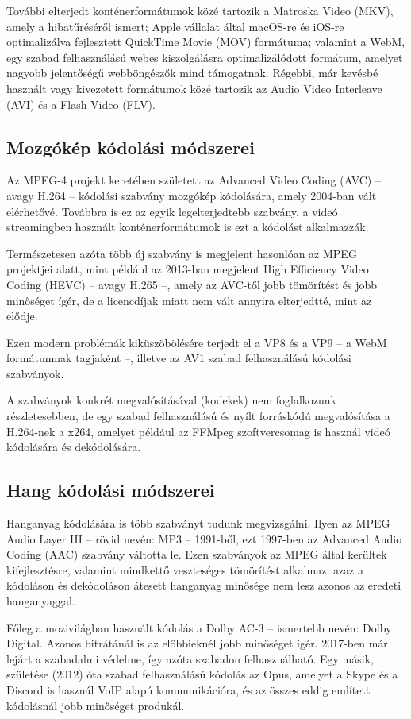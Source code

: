 További elterjedt konténerformátumok közé tartozik a Matroska Video (MKV), amely a hibatűréséről ismert; Apple vállalat által macOS-re és iOS-re optimalizálva fejlesztett QuickTime Movie (MOV) formátuma; valamint a WebM, egy szabad felhasználású webes kiszolgálásra optimalizálódott formátum, amelyet nagyobb jelentőségű webböngészők mind támogatnak. Régebbi, már kevésbé használt vagy kivezetett formátumok közé tartozik az Audio Video Interleave (AVI) és a Flash Video (FLV).

\subsection{Mozgókép kódolási módszerei}

Az MPEG-4 projekt keretében született az Advanced Video Coding (AVC) -- avagy H.264 -- kódolási szabvány mozgókép kódolására, amely 2004-ban vált elérhetővé. Továbbra is ez az egyik legelterjedtebb szabvány, a videó streamingben használt konténerformátumok is ezt a kódolást alkalmazzák.

Természetesen azóta több új szabvány is megjelent hasonlóan az MPEG projektjei alatt, mint például az 2013-ban megjelent High Efficiency Video Coding (HEVC) -- avagy H.265 --, amely az AVC-től jobb tömörítést és jobb minőséget ígér, de a licencdíjak miatt nem vált annyira elterjedtté, mint az elődje.

Ezen modern problémák kiküszöbölésére terjedt el a VP8 és a VP9 -- a WebM formátumnak tagjaként --, illetve az AV1 szabad felhasználású kódolási szabványok.

A szabványok konkrét megvalósításával (kodekek) nem foglalkozunk részletesebben, de egy szabad felhasználású és nyílt forráskódú megvalósítása a H.264-nek a x264, amelyet például az FFMpeg szoftvercsomag is használ videó kódolására és dekódolására.

\subsection{Hang kódolási módszerei}

Hanganyag kódolására is több szabványt tudunk megvizsgálni. Ilyen az MPEG Audio Layer III -- rövid nevén: MP3 -- 1991-ből, ezt 1997-ben az Advanced Audio Coding (AAC) szabvány váltotta le. Ezen szabványok az MPEG által kerültek kifejlesztésre, valamint mindkettő veszteséges tömörítést alkalmaz, azaz a kódoláson és dekódoláson átesett hanganyag minősége nem lesz azonos az eredeti hanganyaggal.

Főleg a mozivilágban használt kódolás a Dolby AC-3  -- ismertebb nevén: Dolby Digital. Azonos bitrátánál is az előbbieknél jobb minőséget ígér. 2017-ben már lejárt a szabadalmi védelme, így azóta szabadon felhasználható. Egy másik, születése (2012) óta szabad felhasználású kódolás az Opus, amelyet a Skype és a Discord is használ VoIP alapú kommunikációra, és az összes eddig említett kódolásnál jobb minőséget produkál.

